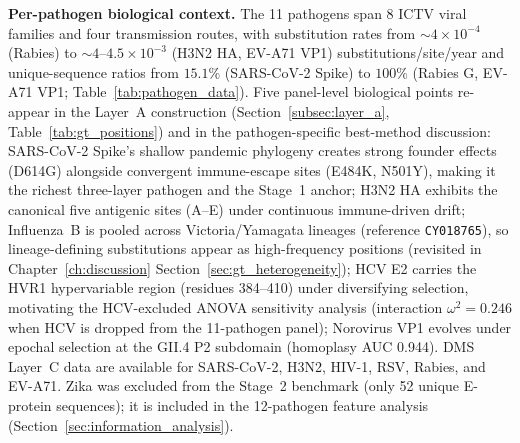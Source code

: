 \medskip
\noindent\textbf{Per-pathogen biological context.}
The 11 pathogens span 8 ICTV viral families and four transmission routes, with substitution rates from $\sim 4 \times 10^{-4}$ (Rabies) to $\sim 4$--$4.5 \times 10^{-3}$ (H3N2 HA, EV-A71 VP1) substitutions/site/year and unique-sequence ratios from $15.1\%$ (SARS-CoV-2 Spike) to $100\%$ (Rabies G, EV-A71 VP1; Table~\ref{tab:pathogen_data}). Five panel-level biological points re-appear in the Layer~A construction (Section~\ref{subsec:layer_a}, Table~\ref{tab:gt_positions}) and in the pathogen-specific best-method discussion: SARS-CoV-2 Spike's shallow pandemic phylogeny creates strong founder effects (D614G) alongside convergent immune-escape sites (E484K, N501Y), making it the richest three-layer pathogen and the Stage~1 anchor; H3N2 HA exhibits the canonical five antigenic sites (A--E) under continuous immune-driven drift; Influenza~B is pooled across Victoria/Yamagata lineages (reference \texttt{CY018765}), so lineage-defining substitutions appear as high-frequency positions (revisited in Chapter~\ref{ch:discussion} Section~\ref{sec:gt_heterogeneity}); HCV E2 carries the HVR1 hypervariable region (residues 384--410) under diversifying selection, motivating the HCV-excluded ANOVA sensitivity analysis (interaction $\omega^2 = 0.246$ when HCV is dropped from the 11-pathogen panel); Norovirus VP1 evolves under epochal selection at the GII.4 P2 subdomain (homoplasy AUC 0.944). DMS Layer~C data are available for SARS-CoV-2, H3N2, HIV-1, RSV, Rabies, and EV-A71. Zika was excluded from the Stage~2 benchmark (only 52 unique E-protein sequences); it is included in the 12-pathogen feature analysis (Section~\ref{sec:information_analysis}).

